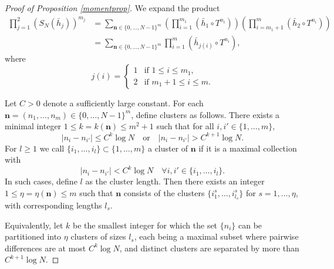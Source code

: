 \documentclass[11pt,twoside,a4paper,reqno]{amsart}
\begin{document}
\begin{proof}[Proof of Proposition \ref{momentprop}]
We expand the product
\begin{align*}
\prod_{j=1}^2 (S_N(\bar{h}_j))^{m_j} &= \sum_{\textbf{n}\in \{0,\ldots,N-1\}^m}
\left(\prod_{i=1}^{m_1} (\bar{h}_1 \circ T^{n_i})\right) \left(\prod_{i=m_1+1}^m (\bar{h}_2 \circ T^{n_i})\right)\\
&=\sum_{\textbf{n}\in \{0,\ldots,N-1\}^m} \prod_{i=1}^{m} (\bar{h}_{j(i)} \circ T^{n_i}),
\end{align*}
where
\begin{equation*}
j(i)=\begin{cases}
1 & \text{if } 1\leq i \leq m_1,\\
2 & \text{if } m_1 + 1 \leq i \leq m.
\end{cases}
\end{equation*}



Let $ C > 0 $ denote a sufficiently large constant. For each $\textbf{n}= (n_1, \dots, n_m)\in \{0,\ldots,N-1\}^m$, define clusters as follows. There exists a minimal integer $1 \leq k=k(\textbf{n}) \leq m^2 + 1$ such that for all $i, i'\in \{1,\dots,m\},$
\begin{equation}\label{nigp}
|n_i - n_{i'}| \leq C^k \log N \quad \text{or} \quad |n_i - n_{i'}| > C^{k+1} \log N.
\end{equation}
For $l\geq 1$ we call $\{i_1,\ldots,i_l\}\subset \{1,\ldots,m\}$ a cluster of $\textbf{n}$ if it is a maximal collection with
\begin{equation*}
|n_i - n_{i'}| < C^k \log N \quad \forall i,i'\in \{i_1,\ldots,i_l\}.
\end{equation*}
In such cases, define $ l $ as the cluster length. Then there exists an integer $1\leq \eta = \eta(\textbf{n}) \leq m$ such that $ \textbf{n}$ consists of the clusters $\{i^s_1, \dots, i^s_{l_s}\}$ for $ s = 1, \dots, \eta $, with corresponding lengths $ l_s $.


Equivalently, let $ k $ be the smallest integer for which the set $\{n_i\}$ can be partitioned into $\eta$ clusters of sizes $l_s$, each being a maximal subset where pairwise differences are at most $C^k \log N$, and distinct clusters are separated by more than $C^{k+1} \log N$.


\end{proof}
\end{document}
